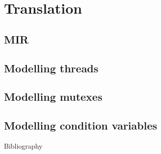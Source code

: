 \documentclass{beamer}
\begin{document}
\section{Translation}

\subsection{MIR}

\subsection{Modelling threads}

\subsection{Modelling mutexes}

\subsection{Modelling condition variables}

\begin{frame}{Bibliography}
  \tiny
  
  
\end{frame}
\end{document}

